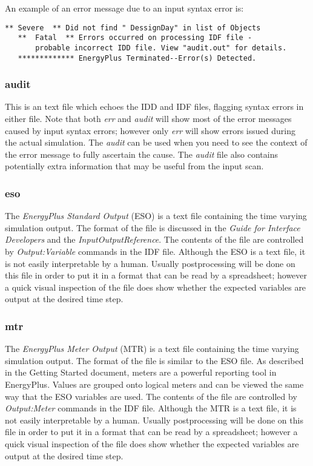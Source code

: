 An example of an error message due to an input syntax error is:

\begin{lstlisting}
** Severe  ** Did not find " DessignDay" in list of Objects
   **  Fatal  ** Errors occurred on processing IDF file -
       probable incorrect IDD file. View "audit.out" for details.
   ************* EnergyPlus Terminated--Error(s) Detected.
\end{lstlisting}

\subsubsection{audit}\label{audit}

This is an text file which echoes the IDD and IDF files, flagging syntax errors in either file. Note that both \emph{err} and \emph{audit} will show most of the error messages caused by input syntax errors; however only \emph{err} will show errors issued during the actual simulation. The \emph{audit} can be used when you need to see the context of the error message to fully ascertain the cause. The \emph{audit} file also contains potentially extra information that may be useful from the input scan.

\subsubsection{eso}\label{eso}

The \emph{EnergyPlus Standard Output} (ESO) is a text file containing the time varying simulation output. The format of the file is discussed in the \emph{Guide for Interface Developers} and the \emph{InputOutputReference}. The contents of the file are controlled by \emph{Output:Variable} commands in the IDF file. Although the ESO is a text file, it is not easily interpretable by a human. Usually postprocessing will be done on this file in order to put it in a format that can be read by a spreadsheet; however a quick visual inspection of the file does show whether the expected variables are output at the desired time step.

\subsubsection{mtr}\label{mtr}

The \emph{EnergyPlus Meter Output} (MTR) is a text file containing the time varying simulation output. The format of the file is similar to the ESO file. As described in the Getting Started document, meters are a powerful reporting tool in EnergyPlus. Values are grouped onto logical meters and can be viewed the same way that the ESO variables are used. The contents of the file are controlled by \emph{Output:Meter} commands in the IDF file. Although the MTR is a text file, it is not easily interpretable by a human. Usually postprocessing will be done on this file in order to put it in a format that can be read by a spreadsheet; however a quick visual inspection of the file does show whether the expected variables are output at the desired time step.

